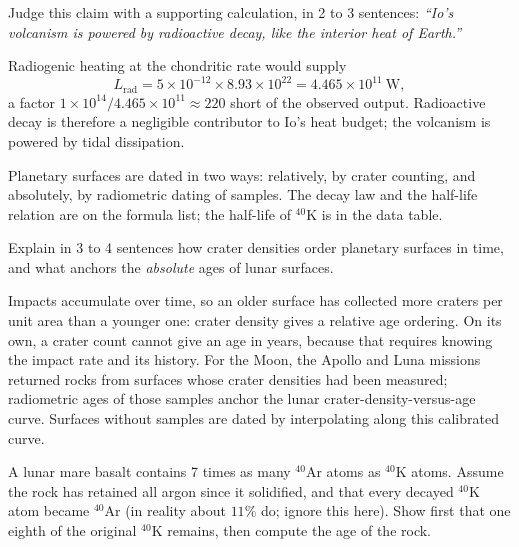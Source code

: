 \parti {} Judge this claim with a supporting calculation, in 2 to 3 sentences:
\emph{``Io's volcanism is powered by radioactive decay, like the interior heat of Earth.''}

\begin{solution}
Radiogenic heating at the chondritic rate would supply
\[
  L_{\mathrm{rad}} = 5 \times 10^{-12} \times 8.93 \times 10^{22} = 4.465 \times 10^{11}\ \mathrm{W},
\]
a factor $1 \times 10^{14} / 4.465 \times 10^{11} \approx 220$ short of the observed output.
Radioactive decay is therefore a negligible contributor to Io's heat budget; the volcanism is powered by tidal dissipation.
\end{solution}



Planetary surfaces are dated in two ways: relatively, by crater counting, and absolutely, by radiometric dating of samples.
The decay law and the half-life relation are on the formula list; the half-life of $^{40}\mathrm{K}$ is in the data table.

\parti {} Explain in 3 to 4 sentences how crater densities order planetary surfaces in time, and what anchors the \emph{absolute} ages of lunar surfaces.

\begin{solution}
Impacts accumulate over time, so an older surface has collected more craters per unit area than a younger one: crater density gives a relative age ordering.
On its own, a crater count cannot give an age in years, because that requires knowing the impact rate and its history.
For the Moon, the Apollo and Luna missions returned rocks from surfaces whose crater densities had been measured; radiometric ages of those samples anchor the lunar crater-density-versus-age curve.
Surfaces without samples are dated by interpolating along this calibrated curve.
\end{solution}

\parti {} A lunar mare basalt contains 7 times as many $^{40}\mathrm{Ar}$ atoms as $^{40}\mathrm{K}$ atoms.
Assume the rock has retained all argon since it solidified, and that every decayed $^{40}\mathrm{K}$ atom became $^{40}\mathrm{Ar}$ (in reality about $11\%$ do; ignore this here).
Show first that one eighth of the original $^{40}\mathrm{K}$ remains, then compute the age of the rock.

